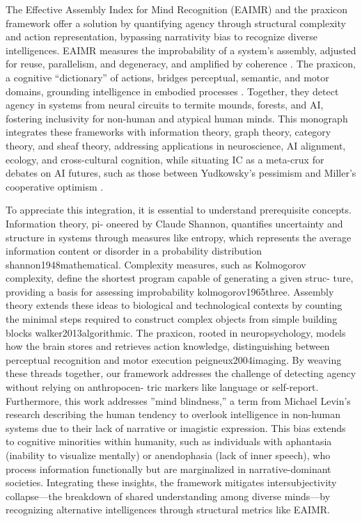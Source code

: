 \documentclass{article}
\begin{document}
The Effective Assembly Index for Mind Recognition (EAIMR) and the praxicon framework offer a solution by quantifying agency through structural complexity and action representation, bypassing narrativity bias to recognize diverse intelligences. EAIMR measures the improbability of a system’s assembly, adjusted for reuse, parallelism, and degeneracy, and amplified by coherence \citep{walker2013algorithmic}. The praxicon, a cognitive “dictionary” of actions, bridges perceptual, semantic, and motor domains, grounding intelligence in embodied processes \citep{pastra2011praxicon, peigneux2004imaging}. Together, they detect agency in systems from neural circuits to termite mounds, forests, and AI, fostering inclusivity for non-human and atypical human minds. This monograph integrates these frameworks with information theory, graph theory, category theory, and sheaf theory, addressing applications in neuroscience, AI alignment, ecology, and cross-cultural cognition, while situating IC as a meta-crux for debates on AI futures, such as those between Yudkowsky’s pessimism and Miller’s cooperative optimism \citep{yudkowsky2008artificial, miller2006robust}.

To appreciate this integration, it is essential to understand prerequisite concepts. Information theory, pi-
oneered by Claude Shannon, quantifies uncertainty and structure in systems through measures like entropy,
which represents the average information content or disorder in a probability distribution {shannon1948mathematical}. Complexity
measures, such as Kolmogorov complexity, define the shortest program capable of generating a given struc-
ture, providing a basis for assessing improbability {kolmogorov1965three}. Assembly theory extends these ideas to biological and technological contexts by counting the minimal steps required to construct complex objects from simple
building blocks {walker2013algorithmic}. The praxicon, rooted in neuropsychology, models how the brain stores and retrieves action knowledge, distinguishing between perceptual recognition and motor execution {peigneux2004imaging}. By weaving these threads together, our framework addresses the challenge of detecting agency without relying on anthropocen-
tric markers like language or self-report.
Furthermore, this work addresses ”mind blindness,” a term from Michael Levin’s research describing the
human tendency to overlook intelligence in non-human systems due to their lack of narrative or imagistic
expression. This bias extends to cognitive minorities within humanity, such as individuals with aphantasia
(inability to visualize mentally) or anendophasia (lack of inner speech), who process information functionally
but are marginalized in narrative-dominant societies. Integrating these insights, the framework mitigates
intersubjectivity collapse—the breakdown of shared understanding among diverse minds—by recognizing
alternative intelligences through structural metrics like EAIMR.
\end{document}
